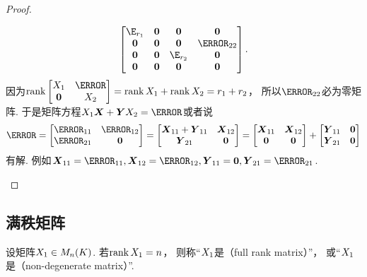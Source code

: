 \begin{example}
\begin{proof}
\begin{itemize}
\[\begin{bmatrix}
			\E_{r_1} & \vb0 & \vb0 & \vb0 \\
			\vb0 & \vb0 & \vb0 & \C_{22} \\
			\vb0 & \vb0 & \E_{r_2} & \vb0 \\
			\vb0 & \vb0 & \vb0 & \vb0
		\end{bmatrix}.
	\]
	因为\(\rank\begin{bmatrix}
		\A & \C \\
		\vb0 & \B
	\end{bmatrix}
	= \rank \A + \rank \B
	= r_1 + r_2\)，
	所以\(\C_{22}\)必为零矩阵.
	于是矩阵方程\(\A\vb{X}+\vb{Y}\B=\C\)或者说\[
		\C = \begin{bmatrix}
			\C_{11} & \C_{12} \\
			\C_{21} & \vb0
		\end{bmatrix}
		= \begin{bmatrix}
			\vb{X}_{11} + \vb{Y}_{11} & \vb{X}_{12} \\
			\vb{Y}_{21} & \vb0
		\end{bmatrix}
		= \begin{bmatrix}
			\vb{X}_{11} & \vb{X}_{12} \\
			\vb0 & \vb0
		\end{bmatrix}
		+ \begin{bmatrix}
			\vb{Y}_{11} & \vb0 \\
			\vb{Y}_{21} & \vb0
		\end{bmatrix}
	\]有解.
	例如\(\vb{X}_{11} = \C_{11}, \vb{X}_{12} = \C_{12}, \vb{Y}_{11} = \vb0, \vb{Y}_{21} = \C_{21}\).
	\qedhere
\end{itemize}
\end{proof}
\end{example}

\subsection{满秩矩阵}
\begin{definition}
设矩阵\(X_1 \in M_n(K)\).
若\(\rank X_1 = n\)，
则称“\(X_1\)是（full rank matrix）”，
或“\(X_1\)是（non-degenerate matrix）”.
\end{definition}



